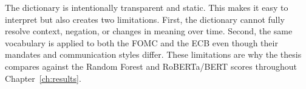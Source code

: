 The dictionary is intentionally transparent and static. This makes it easy to
interpret but also creates two limitations. First, the dictionary cannot fully
resolve context, negation, or changes in meaning over time. Second, the same
vocabulary is applied to both the FOMC and the ECB even though their mandates
and communication styles differ. These limitations are why the thesis compares
\netscore{} against the Random Forest and RoBERTa/BERT scores throughout
Chapter~\ref{ch:results}.



